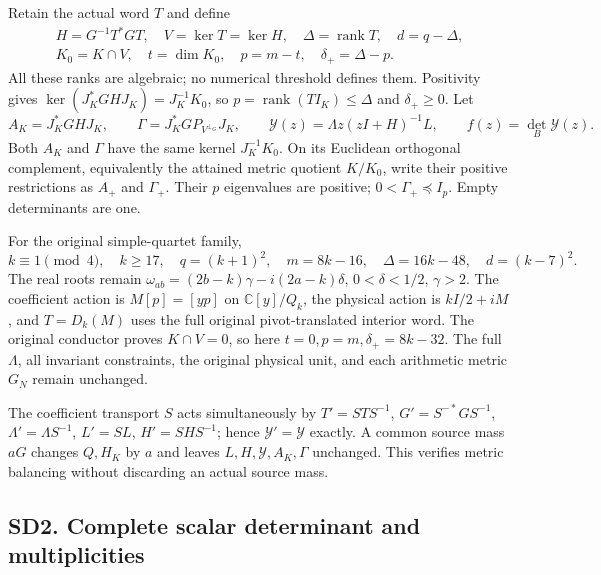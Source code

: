 \documentclass[11pt]{article}
\begin{document}
Retain the actual word \(T\) and define \[
\begin{gathered}
H=G^{-1}T^*GT,\quad V=\ker T=\ker H,\quad
\Delta=\operatorname{rank}T,\quad d=q-\Delta,\\
K_0=K\cap V,\quad t=\dim K_0,\quad p=m-t,\quad \delta_+=\Delta-p.
\end{gathered}
\tag{SD2}
\] All these ranks are algebraic; no numerical threshold defines them. Positivity gives \(\ker(J_K^*GHJ_K)=J_K^{-1}K_0\), so \(p=\operatorname{rank}(TI_K)\le\Delta\) and \(\delta_+\ge0\). Let \[
A_K=J_K^*GHJ_K,\qquad
\Gamma=J_K^*GP_{V^{\perp_G}}J_K,\qquad
\mathscr Y(z)=\Lambda z(zI+H)^{-1}L,\qquad f(z)=\det_B\mathscr Y(z).
\tag{SD3}
\] Both \(A_K\) and \(\Gamma\) have the same kernel \(J_K^{-1}K_0\). On its Euclidean orthogonal complement, equivalently the attained metric quotient \(K/K_0\), write their positive restrictions as \(A_+\) and \(\Gamma_+\). Their \(p\) eigenvalues are positive; \(0<\Gamma_+\preceq I_p\). Empty determinants are one.

For the original simple-quartet family, \[
k\equiv1\pmod4,\quad k\ge17,\quad q=(k+1)^2,\quad
m=8k-16,\quad\Delta=16k-48,\quad d=(k-7)^2.
\tag{SD4}
\] The real roots remain \(\omega_{ab}=(2b-k)\gamma-i(2a-k)\delta\), \(0<\delta<1/2\), \(\gamma>2\). The coefficient action is \(M[p]=[yp]\) on \(\mathbb C[y]/Q_k\), the physical action is \(kI/2+iM\), and \(T=D_k(M)\) uses the full original pivot-translated interior word. The original conductor proves \(K\cap V=0\), so here \(t=0,p=m,\delta_+=8k-32\). The full \(\Lambda\), all invariant constraints, the original physical unit, and each arithmetic metric \(G_N\) remain unchanged.

The coefficient transport \(S\) acts simultaneously by \(T'=STS^{-1}\), \(G'=S^{-*}GS^{-1}\), \(\Lambda'=\Lambda S^{-1}\), \(L'=SL\), \(H'=SHS^{-1}\); hence \(\mathscr Y'=\mathscr Y\) exactly. A common source mass \(aG\) changes \(Q,H_K\) by \(a\) and leaves \(L,H,\mathscr Y,A_K,\Gamma\) unchanged. This verifies metric balancing without discarding an actual source mass.

\subsection{SD2. Complete scalar determinant and multiplicities}\label{sd2.-complete-scalar-determinant-and-multiplicities}
\end{document}
